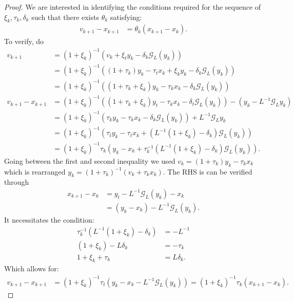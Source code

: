 \documentclass[12pt]{article}
\begin{document}
    \begin{proof}
        We are interested in identifying the conditions required for the sequence of $\xi_k, \tau_k, \delta_k$ such that there exists $\theta_k$ satisfying: 
        \begin{align*}
            v_{k + 1} - x_{k + 1} 
            &= \theta_k(x_{k + 1} - x_k).
        \end{align*}
        To verify, do 
        \begin{align*}
            v_{k + 1} &= 
            (1 + \xi_k)^{-1}(v_k + \xi_t y_k - \delta_k \mathcal G_L(y_k))
            \\
            &= 
            (1 + \xi_k)^{-1}((1 + \tau_k)y_k - \tau_t x_k + \xi_k y_k - \delta_k \mathcal G_L(y_k))
            \\
            &= 
            (1 + \xi_k)^{-1}((1 + \tau_k + \xi_k)y_k - \tau_k x_k - \delta_k \mathcal G_L(y_k))
            \\
            v_{k + 1} - x_{k + 1}
            &= 
            (1 + \xi_k)^{-1}((1 + \tau_k + \xi_k)y_t - \tau_k x_k - \delta_t \mathcal G_L(y_k))
            - (y_k - L^{-1}\mathcal G_Ly_k)
            \\
            &= 
            (1 + \xi_k)^{-1}(\tau_ky_k - \tau_k x_k - \delta_k \mathcal G_L(y_k))
            + L^{-1}\mathcal G_Ly_k
            \\
            &= 
            (1 + \xi_k)^{-1}
            \left(
                \tau_ty_k - \tau_t x_k + (L^{-1}(1 + \xi_k) - \delta_k) \mathcal G_L(y_k)
            \right)
            \\
            &= 
            (1 + \xi_k)^{-1}\tau_k
            \left(
                y_k - x_k + 
                \tau_k^{-1}(L^{-1}(1 + \xi_k) - \delta_k) \mathcal G_L(y_k)
            \right).
        \end{align*}
        Going between the first and second inequality we used $v_k = (1 + \tau_k)y_k - \tau_k x_k$ which is rearranged $y_k = (1 + \tau_k)^{-1}(v_k + \tau_k x_k)$. 
        The RHS is can be verified through 
        \begin{align*}
            x_{k + 1} - x_k &= 
            y_t - L^{-1}\mathcal G_L(y_k) - x_k
            \\
            &= (y_k - x_k) - L^{-1}\mathcal G_L(y_k). 
        \end{align*}
        It necessitates the condition: 
        \begin{align*}
            \tau_k^{-1}(L^{-1}(1 + \xi_k) - \delta_k) 
            &= - L^{-1}
            \\
            (1 + \xi_k) - L\delta_k
            &= 
            - \tau_k
            \\
            1 + \xi_k + \tau_k
            &=
            L\delta_k. 
        \end{align*}
        Which allows for: 
        \begin{align*}
            v_{k + 1} - x_{k + 1} &= 
            (1 + \xi_k)^{-1}\tau_t
            \left(y_k - x_k - L^{-1}\mathcal G_L(y_k)\right) 
            = 
            (1 + \xi_k)^{-1}\tau_k(x_{k + 1} - x_k). 
        \end{align*}
    \end{proof}
\end{document}
